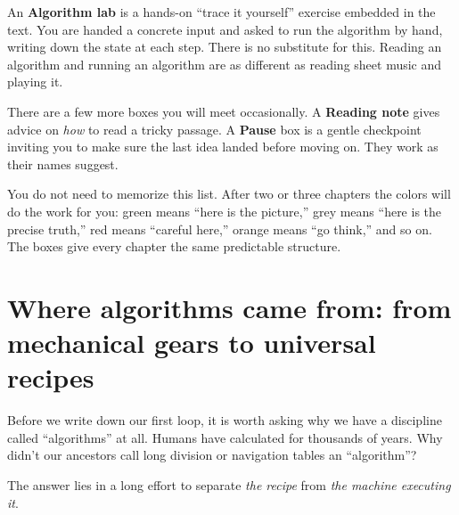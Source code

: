 \begin{labbox}
An \textbf{Algorithm lab} is a hands-on ``trace it yourself'' exercise embedded in
the text. You are handed a concrete input and asked to run the algorithm by hand,
writing down the state at each step. There is no substitute for this. Reading an
algorithm and running an algorithm are as different as reading sheet music and
playing it.
\end{labbox}

\begin{formalbox}
There are a few more boxes you will meet occasionally. A \textbf{Reading note}
gives advice on \emph{how} to read a tricky passage. A \textbf{Pause} box is a
gentle checkpoint inviting you to make sure the last idea landed before moving on.
They work as their names suggest.
\end{formalbox}

\begin{focusbox}
You do not need to memorize this list. After two or three chapters the colors will
do the work for you: green means ``here is the picture,'' grey means ``here is the
precise truth,'' red means ``careful here,'' orange means ``go think,'' and so on.
The boxes give every chapter the same predictable structure.
\end{focusbox}

\section*{Where algorithms came from: from mechanical gears to universal recipes}

Before we write down our first loop, it is worth asking why we
have a discipline called ``algorithms'' at all. Humans have calculated for thousands
of years. Why didn't our ancestors call long division or navigation tables an
``algorithm''?

The answer lies in a long effort to separate \emph{the recipe} from \emph{the machine
executing it}.

